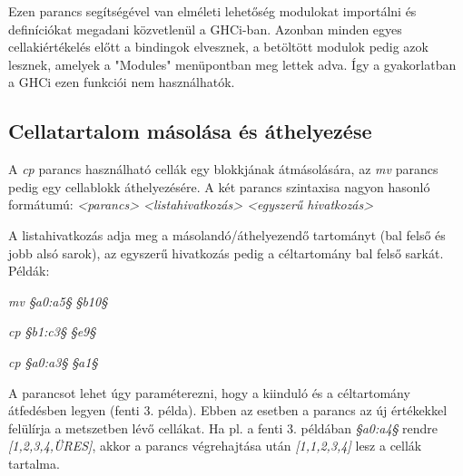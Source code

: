 Ezen parancs segítségével van elméleti lehetőség modulokat importálni és definíciókat megadani közvetlenül a GHCi-ban. Azonban minden egyes cellakiértékelés előtt a bindingok elvesznek, a betöltött modulok pedig azok lesznek, amelyek a "Modules" menüpontban meg lettek adva. Így a gyakorlatban a GHCi ezen funkciói nem használhatók.

\subsection{Cellatartalom másolása és áthelyezése}

A \textit{cp} parancs használható cellák egy blokkjának átmásolására, az \textit{mv} parancs pedig egy cellablokk áthelyezésére. A két parancs szintaxisa nagyon hasonló formátumú: \textit{<parancs> <listahivatkozás> <egyszerű hivatkozás>}

A listahivatkozás adja meg a másolandó/áthelyezendő tartományt (bal felső és jobb alsó sarok), az egyszerű hivatkozás pedig a céltartomány bal felső sarkát. Példák:
\begin{compactenum}
	\item \textit{mv §a0:a5§ §b10§}
	\item \textit{cp §b1:c3§ §e9§}
	\item \textit{cp §a0:a3§ §a1§}
\end{compactenum}

A parancsot lehet úgy paraméterezni, hogy a kiinduló és a céltartomány átfedésben legyen (fenti 3. példa). Ebben az esetben a parancs az új értékekkel felülírja a metszetben lévő cellákat. Ha pl. a fenti 3. példában \textit{§a0:a4§} rendre \textit{[1,2,3,4,ÜRES]}, akkor a parancs végrehajtása után \textit{[1,1,2,3,4]} lesz a cellák tartalma.